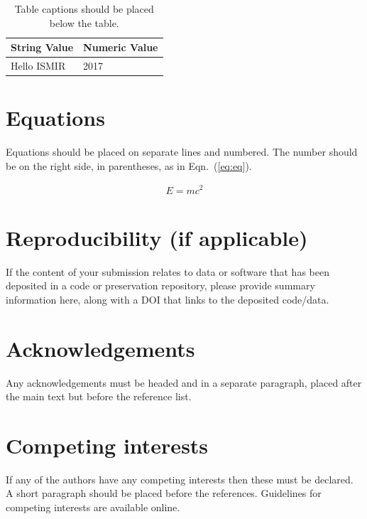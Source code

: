 \documentclass{article}
\begin{document}
\begin{table}[htpb]
\centering
  \begin{tabular}{ll}
  \toprule
  \bfseries String Value & \bfseries Numeric Value \\ \midrule
  Hello ISMIR  & 2017          \\
  \bottomrule
  \end{tabular}
  \caption{Table captions should be placed below the table.}
\label{tab:table}
\end{table}

\section{Equations}\label{sec:equations}

Equations should be placed on separate lines and numbered.
The number should be on the right side, in parentheses,
as in Eqn.~(\ref{eq:eq}).

\begin{align}\label{eq:eq}
E = mc^2
\end{align}

\section{Reproducibility (if applicable)}

If the content of your submission relates to data or software
that has been deposited in a code or preservation repository,
please provide summary information here, along with a DOI that
links to the deposited code/data.

\section{Acknowledgements}

Any acknowledgements must be headed and in a separate paragraph,
placed after the main text but before the reference list.

\section{Competing interests}

If any of the authors have any competing interests then these
must be declared. A short paragraph should be placed before
the references.
Guidelines for competing interests are available online.%
\end{document}
